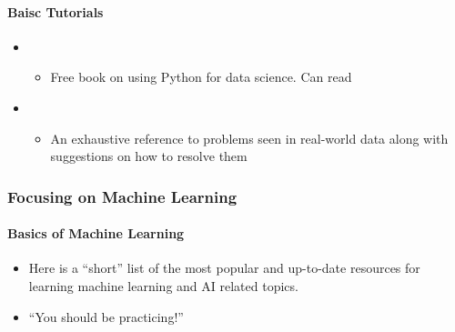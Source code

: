 \documentclass[letterpaper,10pt,english]{sphinxmanual}
\begin{document}
\paragraph{Baisc Tutorials}
\label{\detokenize{resource/research/data_science:baisc-tutorials}}\begin{itemize}
\item {} 
\begin{itemize}
\item {} 
Free book on using Python for data science. Can read

\end{itemize}

\item {} 
\begin{itemize}
\item {} 
An exhaustive reference to problems seen in real-world data along
with suggestions on how to resolve them

\end{itemize}

\end{itemize}


\subsubsection{Focusing on Machine Learning}
\label{\detokenize{stats_data_ml:focusing-on-machine-learning}}

\paragraph{Basics of Machine Learning}
\label{\detokenize{resource/research/machine_learning/machine_learning_basic:basics-of-machine-learning}}\label{\detokenize{resource/research/machine_learning/machine_learning_basic::doc}}\begin{itemize}
\item {} 
Here is a “short” list of the most popular and up-to-date resources
for learning machine learning and AI related topics.

\item {} 
“You should be practicing!”

\end{itemize}
\end{document}
